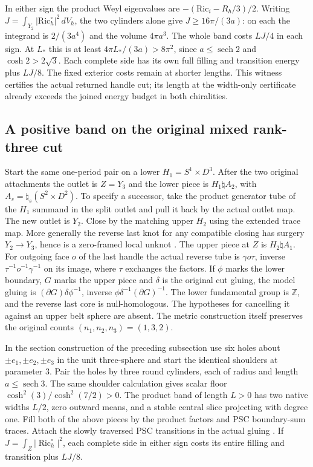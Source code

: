 \documentclass[11pt,letterpaper]{article}
\numberwithin{equation}{section}
\theoremstyle{remark}
\DeclareMathOperator{\Ric}{Ric}
\begin{document}
In either sign the product Weyl eigenvalues are
\(-(\mathrm{Ric}_i-R_h/3)/2\).
Writing \(J=\int_{Y_2}|\mathrm{Ric}_h^\circ|^2\,dV_h\),
the two cylinders alone give \(J\ge16\pi/(3a)\):
on each the integrand is \(2/(3a^4)\) and the volume \(4\pi a^3\).
The whole band costs \(LJ/4\) in each sign. At \(L_*\) this is
at least \(4\pi L_*/(3a)>8\pi^2\), since
\(a\le\operatorname{sech}2\) and \(\cosh2>2\sqrt3\).
Each complete side has its own full filling and transition
energy plus \(LJ/8\). The fixed exterior costs remain at shorter
lengths. This witness certifies the actual returned handle cut;
its length at the width-only certificate already exceeds the
joined energy budget in both chiralities.

\subsection{A positive band on the original mixed rank-three cut}
Start the same one-period pair on a lower \(H_1=S^1\times D^3\).
After the two original attachments the outlet is \(Z=Y_3\) and the
lower piece is \(H_1\natural A_2\), with
\(A_s=\natural_s(S^2\times D^2)\). To specify a successor, take the
product generator tube of the \(H_1\) summand in the split outlet
and pull it back by the actual outlet map. The new outlet is \(Y_2\).
Close by the matching upper \(H_2\) using the extended trace map.
More generally the reverse last knot for any compatible closing
has surgery \(Y_2\to Y_3\), hence is a zero-framed local unknot
\cite[Theorem 5.1]{MeierSchirmerZupan2016Trisections}.
The upper piece at \(Z\) is \(H_2\natural A_1\). For outgoing face \(o\) of the last handle the actual reverse tube
is \(\gamma o\tau\), inverse \(\tau^{-1}o^{-1}\gamma^{-1}\) on its
image, where \(\tau\) exchanges the factors. If \(\phi\) marks the
lower boundary, \(G\) marks the upper piece and \(\delta\) is the
original cut gluing, the model gluing is
\((\partial G)\delta\phi^{-1}\), inverse
\(\phi\delta^{-1}(\partial G)^{-1}\). The lower fundamental
group is \(\mathbb Z\), and the reverse last core is null-homologous.
The hypotheses for cancelling it against an upper belt sphere are
absent. The metric construction itself preserves the original
counts \((n_1,n_2,n_3)=(1,3,2)\).

In the section construction of the preceding subsection use six
holes about \(\pm e_1,\pm e_2,\pm e_3\) in the unit three-sphere and start
the identical shoulders at parameter 3. Pair the holes by three
round cylinders, each of radius and length \(a\le\operatorname{sech}3\).
The same shoulder calculation gives scalar floor
\(\cosh^2(3)/\cosh^2(7/2)>0\). The product band of length \(L>0\)
has two native widths \(L/2\), zero outward means, and a stable
central slice projecting with degree one. Fill both of the above
pieces by the product factors and PSC boundary-sum traces. Attach
the slowly traversed PSC transitions in the actual gluing
\cite{Walsh2008Metrics,BamlerKleiner2019Contractibility}.
If \(J=\int_Z|\Ric_h^\circ|^2\), each complete side in either sign
costs its entire filling and transition plus \(LJ/8\).
\end{document}
